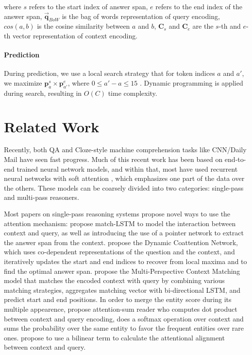 \documentclass[11pt,letterpaper]{article}
\begin{document}
where $s$ refers to the start index of answer span, $e$ refers to the end index of the answer span, $\bm{\vec{q}}_{BoW}$ is the bag of words representation of query encoding, $cos(a,b)$ is the cosine similarity between $a$ and $b$, $\bm{C}_s$ and $\bm{C}_e$ are the $s$-th and $e$-th vector representation of context encoding.

\paragraph{Prediction} During prediction, we use a local search strategy that for token indices $a$ and $a'$, we maximize $\bm{p}^s_{a} \times \bm{p}^e_{a'}$, where $0 \le a' - a \le 15$ . Dynamic programming is applied during search, resulting in $O(C)$ time complexity. 
 \section{Related Work}
Recently, both QA and Cloze-style machine comprehension tasks like CNN/Daily Mail have seen fast progress. Much of this recent work has been based on end-to-end trained neural network models, and within that, most have used recurrent neural networks with soft attention  \cite{attention_Bahdanau:2014vz}, which emphasizes one part of the data over the others. These models can be coarsely divided into two categories: single-pass and multi-pass reasoners.

Most papers on single-pass reasoning systems propose novel ways to use the attention mechanism:  propose match-LSTM to model the interaction between context and query, as well as introducing the use of a pointer network \cite{pointer_network_Vinyals:2015uw} to extract the answer span from the context.   propose the Dynamic Coattention Network, which uses co-dependent representations of the question and the context, and iteratively updates the start and end indices to recover from local maxima and to find the optimal answer span.  propose the Multi-Perspective Context Matching model that matches the encoded context with query by combining various matching strategies, aggregates matching vector with bi-directional LSTM, and predict start and end positions. In order to merge the entity score during its multiple appearence,  propose attention-sum reader who computes dot product between context and query encoding, does a softmax operation over context and sums the probability over the same entity to favor the frequent entities over rare ones.  propose to use a bilinear term to calculate the attentional alignment between context and query.
\end{document}
